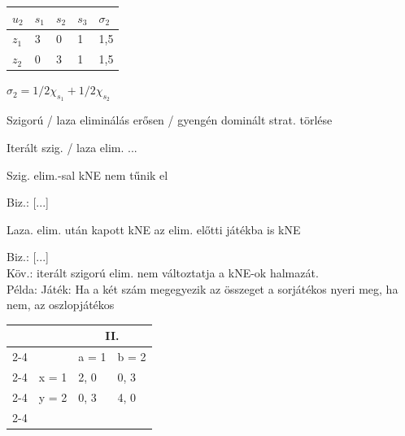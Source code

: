 \begin{center}
	\begin{tabular}{|l|l|l|l|l|}
		\hline
		$u_2$ & $s_1$ & $s_2$ & $s_3$ & $\sigma_2$ \\ \hline
		$z_1$ & 3    & 0    & 1    & 1,5                      \\ \hline
		$z_2$ & 0    & 3    & 1    & 1,5                      \\ \hline
	\end{tabular}
\end{center}

\begin{center}
	$\sigma_2 = 1/2 \chi_{s_1} + 1/2 \chi_{s_2}$
\end{center}

\begin{definition}{Szigorú / laza eliminálás}{}
	erősen / gyengén dominált strat. törlése
\end{definition}

\begin{definition}{}{}
	Iterált szig. / laza elim. ...
\end{definition}

\begin{statement}{}{}
	Szig. elim.-sal kNE nem tűnik el
\end{statement}

Biz.: [...]

\begin{statement}{}{}
	Laza. elim. után kapott kNE az elim. előtti játékba is kNE
\end{statement}

Biz.: [...] \\

Köv.: iterált szigorú elim. nem változtatja a kNE-ok halmazát. \\ 

Példa: Játék: Ha a két szám megegyezik az összeget a sorjátékos nyeri meg, ha nem, az oszlopjátékos

\begin{center}
	\begin{tabular}{llll}
		&                            & \multicolumn{2}{c}{II.}                                 \\ \cline{2-4} 
		\multicolumn{1}{l|}{}   & \multicolumn{1}{l|}{}      & \multicolumn{1}{l|}{a = 1} & \multicolumn{1}{l|}{b = 2} \\ \cline{2-4} 
		\multicolumn{1}{l|}{I.} & \multicolumn{1}{l|}{x = 1} & \multicolumn{1}{l|}{2, 0}  & \multicolumn{1}{l|}{0, 3}  \\ \cline{2-4} 
		\multicolumn{1}{l|}{}   & \multicolumn{1}{l|}{y = 2} & \multicolumn{1}{l|}{0, 3}  & \multicolumn{1}{l|}{4, 0}  \\ \cline{2-4} 
	\end{tabular}
\end{center}


